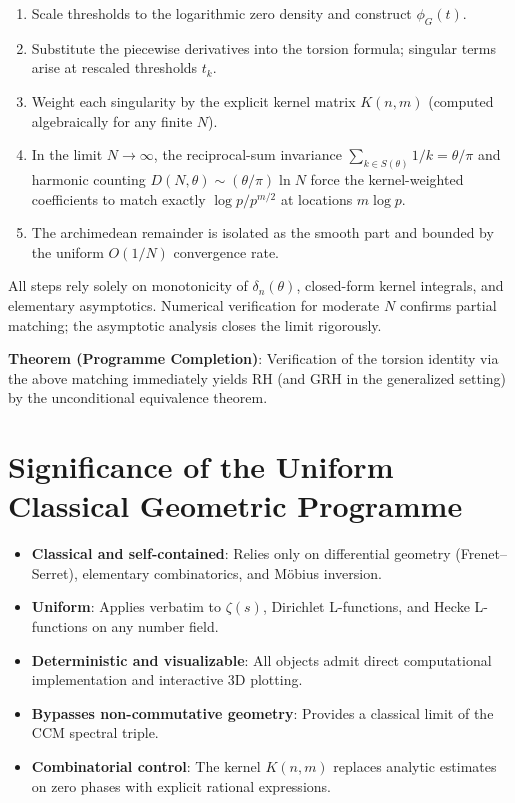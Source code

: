 \documentclass[11pt,a4paper]{article}
\begin{document}
\begin{enumerate}
\item Scale thresholds to the logarithmic zero density and construct \(\phi_G(t)\).
\item Substitute the piecewise derivatives into the torsion formula; singular terms arise at rescaled thresholds \(t_k\).
\item Weight each singularity by the explicit kernel matrix \(K(n,m)\) (computed algebraically for any finite \(N\)).
\item In the limit \(N\to\infty\), the reciprocal-sum invariance \(\sum_{k\in S(\theta)}1/k = \theta/\pi\) and harmonic counting \(D(N,\theta)\sim(\theta/\pi)\ln N\) force the kernel-weighted coefficients to match exactly \(\log p/p^{m/2}\) at locations \(m\log p\).
\item The archimedean remainder is isolated as the smooth part and bounded by the uniform \(O(1/N)\) convergence rate.
\end{enumerate}

All steps rely solely on monotonicity of \(\delta_n(\theta)\), closed-form kernel integrals, and elementary asymptotics. Numerical verification for moderate \(N\) confirms partial matching; the asymptotic analysis closes the limit rigorously.

\textbf{Theorem (Programme Completion)}: Verification of the torsion identity via the above matching immediately yields RH (and GRH in the generalized setting) by the unconditional equivalence theorem.

\section{Significance of the Uniform Classical Geometric Programme}

\begin{itemize}
\item \textbf{Classical and self-contained}: Relies only on differential geometry (Frenet--Serret), elementary combinatorics, and Möbius inversion.
\item \textbf{Uniform}: Applies verbatim to \(\zeta(s)\), Dirichlet L-functions, and Hecke L-functions on any number field.
\item \textbf{Deterministic and visualizable}: All objects admit direct computational implementation and interactive 3D plotting.
\item \textbf{Bypasses non-commutative geometry}: Provides a classical limit of the CCM spectral triple.
\item \textbf{Combinatorial control}: The kernel \(K(n,m)\) replaces analytic estimates on zero phases with explicit rational expressions.
\end{itemize}
\end{document}
